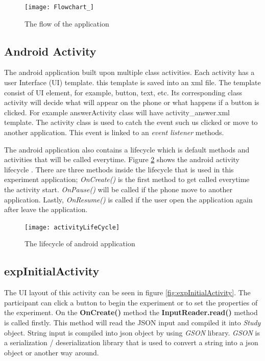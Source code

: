 \begin{figure}
\begin{center}
\texttt{[image: Flowchart\_]}
\end{center}
\centering
\captionsetup{justification=centering}
\caption{The flow of the application}
\label{fig:flowOfApplication}
\end{figure}

\subsection{Android Activity}
The android application built upon multiple class activities.
Each activity has a user Interface (UI) template. this template is saved into an xml file. The template consist of UI element, for example, button, text, etc.
Its corresponding class activity will decide what will appear on the phone or what happens if a button is clicked.
For example answerActivity class will have activity\_answer.xml template.
The activity class is used to catch the event such us clicked or move to another application. This event is linked to an \textit{event listener} methods.

The android application also contains a lifecycle which is  default methods and activities that will be called everytime.
Figure \ref{fig:theLifeCycleOfActivity} shows the android activity lifecycle \citep{androidActivity}.
There are three methods inside the lifecycle that is used in this experiment application;
 \textit{OnCreate()} is the first method to get called everytime the activity start.
 \textit{OnPause()} will be called if the phone move to another application.
 Lastly,  \textit{OnResume()} is called if the user open the application again after leave the application.

\begin{figure}[!tbh]
\begin{center}
\texttt{[image: activityLifeCycle]}
\end{center}
\centering
\captionsetup{justification=centering}
\caption{The lifecycle of android application}
\label{fig:theLifeCycleOfActivity}
\end{figure}



\subsection{expInitialActivity}
The UI layout of this activity can be seen in figure \ref{fig:expInitialActivity}.
The participant can click a button to begin the experiment or to set the properties of the experiment.
On the \textbf{OnCreate()} method the \textbf{InputReader.read()} method is called firstly.
This method will read the JSON input and compiled it into \textit{Study} object.
String input is compiled into json object by using \textit{GSON} library.
\textit{GSON} is a serialization / deserialization library that is used to convert a string into a json object or another way around. \citep{gsonLib}

